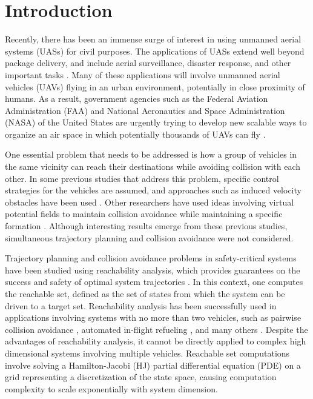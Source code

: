 \section{Introduction}
Recently, there has been an immense surge of interest in using unmanned aerial systems (UASs) for civil purposes. The applications of UASs extend well beyond package delivery, and include aerial surveillance, disaster response, and other important tasks \cite{Tice91, Debusk10, Amazon16, AUVSI16, BBC16}. Many of these applications will involve unmanned aerial vehicles (UAVs) flying in an urban environment, potentially in close proximity of humans. As a result, government agencies such as the Federal Aviation Administration (FAA) and National Aeronautics and Space Administration (NASA) of the United States are urgently trying to develop new scalable ways to organize an air space in which potentially thousands of UAVs can fly \cite{FAA13, NASA16,Kopardekar16}.

One essential problem that needs to be addressed is how a group of vehicles in the same vicinity can reach their destinations while avoiding collision with each other. In some previous studies that address this problem, specific control strategies for the vehicles are assumed, and approaches such as induced velocity obstacles have been used \cite{Fiorini98, Chasparis05, Vandenberg08}. Other researchers have used ideas involving virtual potential fields to maintain collision avoidance while maintaining a specific formation \cite{Saber02, Chuang07}. Although interesting results emerge from these previous studies, simultaneous trajectory planning and collision avoidance were not considered. 

Trajectory planning and collision avoidance problems in safety-critical systems have been studied using reachability analysis, which provides guarantees on the success and safety of optimal system trajectories \cite{Barron90, Mitchell05, Bokanowski10, Bokanowski11, Margellos11, Fisac15}. In this context, one computes the reachable set, defined as the set of states from which the system can be driven to a target set. Reachability analysis has been successfully used in applications involving systems with no more than two vehicles, such as pairwise collision avoidance \cite{Mitchell05}, automated in-flight refueling \cite{Ding08}, and many others \cite{Huang11, Bayen07}. Despite the advantages of reachability analysis, it cannot be directly applied to complex high dimensional systems involving multiple vehicles. Reachable set computations involve solving a Hamilton-Jacobi (HJ) partial differential equation (PDE) on a grid representing a discretization of the state space, causing computation complexity to scale exponentially with system dimension. 

